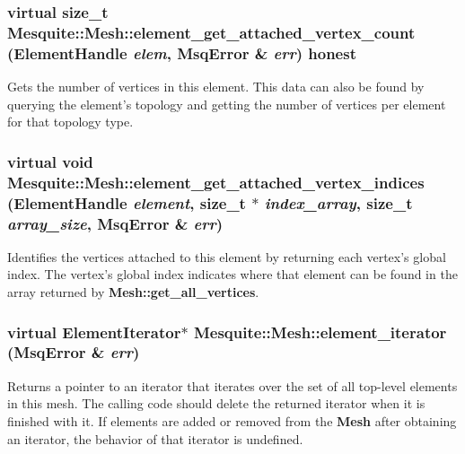 \documentclass[letter]{report}
\begin{document}
\subsubsection{\setlength{\rightskip}{0pt plus 5cm}virtual size\_\-t Mesquite::Mesh::element\_\-get\_\-attached\_\-vertex\_\-count (Element\-Handle {\em elem}, {\bf Msq\-Error} \& {\em err}) honest\hspace{0.3cm}{\tt  [pure virtual]}}\label{classMesquite_1_1Mesh_a17}


Gets the number of vertices in this element. This data can also be found by querying the element's topology and getting the number of vertices per element for that topology type. 

\subsubsection{\setlength{\rightskip}{0pt plus 5cm}virtual void Mesquite::Mesh::element\_\-get\_\-attached\_\-vertex\_\-indices (Element\-Handle {\em element}, size\_\-t $\ast$ {\em index\_\-array}, size\_\-t {\em array\_\-size}, {\bf Msq\-Error} \& {\em err})\hspace{0.3cm}{\tt  [pure virtual]}}\label{classMesquite_1_1Mesh_a19}


Identifies the vertices attached to this element by returning each vertex's global index. The vertex's global index indicates where that element can be found in the array returned by {\bf Mesh::get\_\-all\_\-vertices}. 

\subsubsection{\setlength{\rightskip}{0pt plus 5cm}virtual Element\-Iterator$\ast$ Mesquite::Mesh::element\_\-iterator ({\bf Msq\-Error} \& {\em err})\hspace{0.3cm}{\tt  [pure virtual]}}\label{classMesquite_1_1Mesh_a6}


Returns a pointer to an iterator that iterates over the set of all top-level elements in this mesh. The calling code should delete the returned iterator when it is finished with it. If elements are added or removed from the {\bf Mesh} after obtaining an iterator, the behavior of that iterator is undefined. 

\end{document}
